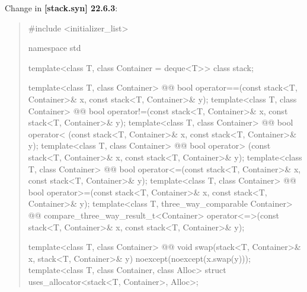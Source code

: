 \documentclass{wg21}
\begin{document}
Change in \textbf{[stack.syn] 22.6.3}:
\begin{quote}
\begin{codeblock}
#include <initializer_list>

namespace std {
  template<class T, class Container = deque<T>> class stack;
  
  template<class T, class Container>
    @@ bool operator==(const stack<T, Container>& x, const stack<T, Container>& y);
  template<class T, class Container>
    @@ bool operator!=(const stack<T, Container>& x, const stack<T, Container>& y);
  template<class T, class Container>
    @@ bool operator< (const stack<T, Container>& x, const stack<T, Container>& y);
  template<class T, class Container>
    @@ bool operator> (const stack<T, Container>& x, const stack<T, Container>& y);
  template<class T, class Container>
    @@ bool operator<=(const stack<T, Container>& x, const stack<T, Container>& y);
  template<class T, class Container>
    @@ bool operator>=(const stack<T, Container>& x, const stack<T, Container>& y);
  template<class T, three_way_comparable Container>
    @@ compare_three_way_result_t<Container>
      operator<=>(const stack<T, Container>& x, const stack<T, Container>& y);
  
  template<class T, class Container>
    @@ void swap(stack<T, Container>& x, stack<T, Container>& y) 
      noexcept(noexcept(x.swap(y)));
  template<class T, class Container, class Alloc>
    struct uses_allocator<stack<T, Container>, Alloc>;
}
\end{codeblock}
\end{quote}
\end{document}
